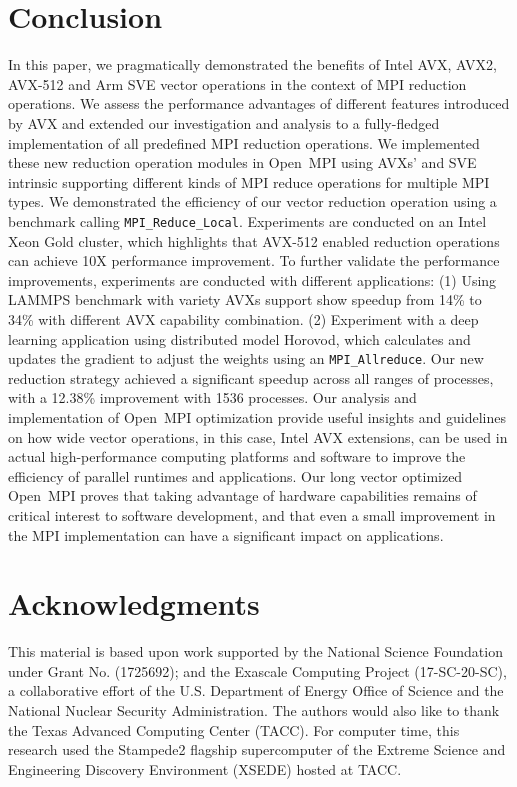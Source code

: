 \documentclass[5p,times,twocolumn]{elsarticle}
\newcommand{\mpifunc}[1]{\lstinline"MPI_#1"\xspace}
\newcommand{\ompi}[0]{Open~MPI\xspace}
\newcommand{\mpi}[0]{\textsc{MPI}\xspace}
\begin{document}
\section{Conclusion}\label{sec:conclusion}
In this paper, we pragmatically demonstrated the benefits of Intel
AVX, AVX2, AVX-512 and Arm SVE vector operations in the context of MPI reduction
operations. We assess the performance advantages of different features
introduced by AVX and extended our investigation and analysis to a
fully-fledged implementation of all predefined MPI reduction
operations.
%
We implemented these new reduction operation modules in \ompi using AVXs'
and SVE intrinsic supporting different kinds of \mpi reduce operations for
multiple \mpi types. We demonstrated the efficiency of our vector
reduction operation using a benchmark calling
\mpifunc{Reduce_Local}. Experiments are conducted on an Intel Xeon
Gold cluster, which highlights that AVX-512 enabled reduction operations can
achieve 10X performance improvement.
%
To further validate the performance improvements, experiments are
conducted with different applications: (1) Using LAMMPS benchmark with variety AVXs
support show speedup from 14\% to 34\% with different AVX capability combination.
(2) Experiment with a deep learning application
using distributed model Horovod, which calculates and updates the
gradient to adjust the weights using an \mpifunc{Allreduce}.  Our new
reduction strategy achieved a significant speedup across all ranges of
processes, with a 12.38\% improvement with 1536 processes.  Our
analysis and implementation of \ompi optimization provide useful
insights and guidelines on how wide vector operations, in this case,
Intel AVX extensions, can be used in actual high-performance computing
platforms and software to improve the efficiency of parallel runtimes
and applications.
%
Our long vector optimized \ompi proves that taking advantage of hardware
capabilities remains of critical interest to software development, and
that even a small improvement in the MPI implementation can have
a significant impact on applications.

\section*{Acknowledgments}
%
This material is based upon work supported by the National Science Foundation under Grant No. (1725692); and the Exascale Computing Project (17-SC-20-SC), a collaborative effort of the
U.S. Department of Energy Office of Science and the National Nuclear Security Administration.
The authors would also like to thank the
Texas Advanced Computing Center (TACC). For computer time, this research used
the Stampede2 flagship supercomputer of the Extreme Science and Engineering Discovery Environment (XSEDE) hosted at TACC.

\balance

%
%


\end{document}
